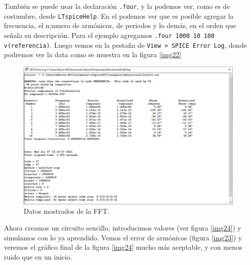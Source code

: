 \documentclass[a4paper]{article} %
\begin{document}
También se puede usar la declaración \texttt{.four}, y la podemos ver, como es de costumbre, desde \texttt{LTspiceHelp}. En el podemos ver que es posible agregar la frecuencia, el n;umero de armónicos, de periodos y lo demás, en el orden que señala su descripción. Para el ejemplo agregamos \texttt{.four 1000 10 100 v(referencia)}. Luego vemos en la pestaña de \texttt{View > SPICE Error Log}, donde podremos ver la data como se muestra en la figura \eqref{img22}

\begin{figure} %
	\centering %
	\includegraphics[scale=0.4]{IMAGENES/img22} %
	\caption{Datos mostrados de la FFT.} %
	\label{img22} %
\end{figure} %

Ahora creamos un circuito sencillo, introducimos valores (ver figura \eqref{img24}) y simulamos con lo ya aprendido. Vemos el error de armónicos (figura \eqref{img23}) y veremos el gráfico final de la figura \eqref{img24} mucho más aceptable, y con menos ruido que en un inicio.
\end{document}
